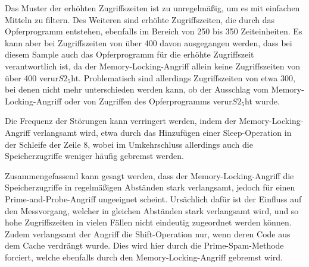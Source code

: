 Das Muster der erhöhten Zugriffszeiten ist zu unregelmäßig, um es mit einfachen Mitteln zu filtern.
Des Weiteren sind erhöhte Zugriffszeiten, die durch das Opferprogramm entstehen, ebenfalls im Bereich von 250 bis 350 Zeiteinheiten.
Es kann aber bei Zugriffszeiten von über 400 davon ausgegangen werden, dass bei diesem Sample auch das Opferprogramm für die erhöhte Zugriffszeit verantwortlich ist, da der Memory-Locking-Angriff allein keine Zugriffszeiten von über 400 verur$S2_5$ht.
Problematisch sind allerdings Zugriffszeiten von etwa 300, bei denen nicht mehr unterschieden werden kann, ob der Ausschlag vom Memory-Locking-Angriff oder von Zugriffen des Opferprogramms verur$S2_5$ht wurde.

Die Frequenz der Störungen kann verringert werden, indem der Memory-Locking-Angriff verlangsamt wird, etwa durch das Hinzufügen einer Sleep-Operation in der Schleife der Zeile 8, wobei im Umkehrschluss allerdings auch die Speicherzugriffe weniger häufig gebremst werden.

Zusammengefassend kann gesagt werden, dass der Memory-Locking-Angriff die Speicherzugriffe in regelmäßigen Abständen stark verlangsamt, jedoch für einen Prime-and-Probe-Angriff ungeeignet scheint.
Ursächlich dafür ist der Einfluss auf den Messvorgang, welcher in gleichen Abständen stark verlangsamt wird, und so hohe Zugriffszeiten in vielen Fällen nicht eindeutig zugeordnet werden können.
Zudem verlangsamt der Angriff die Shift-Operation nur, wenn deren Code aus dem Cache verdrängt wurde.
Dies wird hier durch die Prime-Spam-Methode forciert, welche ebenfalls durch den Memory-Locking-Angriff gebremst wird.







